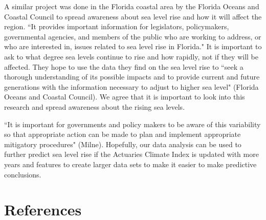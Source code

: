\documentclass[12pt]{report}
\begin{document}
\par A similar project was done in the Florida coastal area by the Florida Oceans and Coastal Council to spread awareness about sea level rise and how it will affect the region. \textquotedblleft It provides important information for legislators, policymakers, governmental agencies, and members of the public who are working to address, or who are interested in, issues related to sea level rise in Florida." It is important to ask to what degree sea levels continue to rise and how rapidly, not if they will be affected. They hope to use the data they find on the sea level rise to \textquotedblleft seek a thorough understanding of its possible impacts and to provide current and future generations with the information necessary to adjust to higher sea level" (Florida Oceans and Coastal Council). We agree that it is important to look into this research and spread awareness about the rising sea levels. 
\par \textquotedblleft It is important for governments and policy makers to be aware of this variability so that appropriate action can be made to plan and implement appropriate mitigatory procedures" (Milne). Hopefully, our data analysis can be used to further predict sea level rise if the Actuaries Climate Index is updated with more years and features to create larger data sets to make it easier to make predictive conclusions. 

\newpage 
\section*{References}	
	
	
	
	
	
\end{document}
